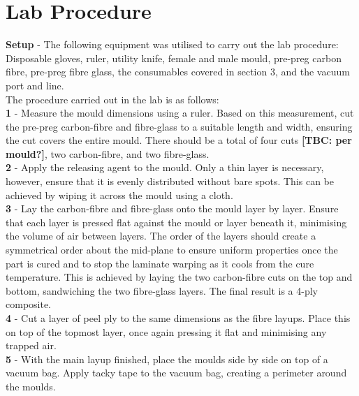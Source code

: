 \documentclass[11pt,a4paper]{article}
\newcommand{\added}[1]{\textcolor{addgreen}{#1}}
\newcommand{\added}[1]{#1}
\newcommand{\tbc}[1]{\added{\textbf{[TBC\if\relax\detokenize{#1}\relax\else: #1\fi]}}}
\begin{document}
\section{Lab Procedure}
\label{sec:procedure}

\textbf{Setup} - The following equipment was utilised to carry out the lab procedure: Disposable gloves, ruler, utility knife, female and male mould, pre-preg carbon fibre, pre-preg fibre glass, the consumables covered in section 3, and the vacuum port and line.\\

The procedure carried out in the lab is as follows:\\

\textbf{1} - Measure the \added{mould} dimensions using a ruler. Based on this measurement, cut the pre-preg carbon-fibre and fibre-glass to a suitable length and width, ensuring the cut covers the entire \added{mould}. There should be a total of four cuts \tbc{per mould?}, two carbon-fibre, and two fibre-glass.\\

\textbf{2} - Apply the releasing agent to the \added{mould}. Only a thin layer is necessary, however, ensure that it is evenly distributed without bare spots. This can be achieved by wiping it across the \added{mould} using a cloth.\\

\textbf{3} - Lay the carbon-fibre and fibre-glass onto the mould layer by layer. Ensure that each layer is pressed flat against the \added{mould} or layer beneath it, minimising the volume of air between layers. The order of the layers should create a symmetrical order about the mid-plane to ensure uniform properties once the part is cured \added{and to stop the laminate warping as it cools from the cure temperature}. This is achieved by laying \added{the} two carbon-fibre cuts on the top and bottom, sandwiching the two fibre-glass layers. The final result is a 4-ply composite.\\

\textbf{4} - Cut a layer of peel ply to the same dimensions as the fibre layups. Place this on top of the topmost layer, once again pressing it flat and minimising any trapped air.\\

\textbf{5} - With the main layup finished, place the \added{moulds} side by side on top of a vacuum bag. Apply tacky tape to the vacuum bag, creating a perimeter around the \added{moulds}.\\
\end{document}
